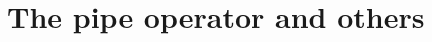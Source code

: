 %
%
%	
%	
%	
%	
%	
%	
%	
%	
%	
%	
%	
%







\section{The pipe operator and others}\label{app:pipe}

